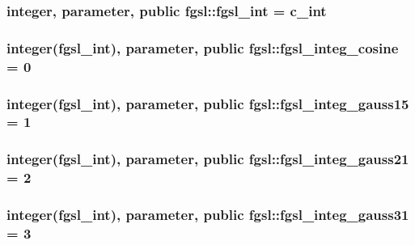 \subsubsection[{fgsl\+\_\+int}]{\setlength{\rightskip}{0pt plus 5cm}integer, parameter, public fgsl\+::fgsl\+\_\+int = c\+\_\+int}\label{namespacefgsl_a222deda1d7a0c0e845ce4a683318efeb}
\hypertarget{namespacefgsl_a32ea398e71abe5dd44ef510e11dcfa87}{}
\subsubsection[{fgsl\+\_\+integ\+\_\+cosine}]{\setlength{\rightskip}{0pt plus 5cm}integer({\bf fgsl\+\_\+int}), parameter, public fgsl\+::fgsl\+\_\+integ\+\_\+cosine = 0}\label{namespacefgsl_a32ea398e71abe5dd44ef510e11dcfa87}
\hypertarget{namespacefgsl_ae892609677dce6cab285f1a12f956f84}{}
\subsubsection[{fgsl\+\_\+integ\+\_\+gauss15}]{\setlength{\rightskip}{0pt plus 5cm}integer({\bf fgsl\+\_\+int}), parameter, public fgsl\+::fgsl\+\_\+integ\+\_\+gauss15 = 1}\label{namespacefgsl_ae892609677dce6cab285f1a12f956f84}
\hypertarget{namespacefgsl_a3c4e8f9478c6a8ab3bab6580929c8894}{}
\subsubsection[{fgsl\+\_\+integ\+\_\+gauss21}]{\setlength{\rightskip}{0pt plus 5cm}integer({\bf fgsl\+\_\+int}), parameter, public fgsl\+::fgsl\+\_\+integ\+\_\+gauss21 = 2}\label{namespacefgsl_a3c4e8f9478c6a8ab3bab6580929c8894}
\hypertarget{namespacefgsl_a6fd868988f11aa3c2ab7c6a3d60ab1a0}{}
\subsubsection[{fgsl\+\_\+integ\+\_\+gauss31}]{\setlength{\rightskip}{0pt plus 5cm}integer({\bf fgsl\+\_\+int}), parameter, public fgsl\+::fgsl\+\_\+integ\+\_\+gauss31 = 3}\label{namespacefgsl_a6fd868988f11aa3c2ab7c6a3d60ab1a0}
\hypertarget{namespacefgsl_a5c219f8f951d411c63849088e0e224da}{}
